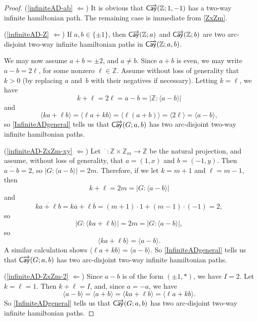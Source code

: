 \documentclass[11pt]{amsart}
\theoremstyle{definition}
\newcounter{case}
\numberwithin{case}{startcases}
\numberwithin{equation}{section}
\newcommand{\Z}{\mathbb{Z}}  %
\newcommand{\cayd}{\mathop{\mathsf{C}\mkern-1mu\overrightarrow{\mathsf{ay}}}}
\begin{document}
	\begin{proof}
		
		\medbreak
		
		(\ref{infiniteAD-ab} $\Leftarrow$) It is obvious that $\cayd(\Z; 1, -1)$ has a two-way infinite hamiltonian path. The remaining case is immediate from \cref{ZxZm}.
		
		\medbreak
		(\ref{infiniteAD-Z} $\Leftarrow$) If $a , b \in \{\pm 1\}$, then $\cayd(\Z; a)$ and $\cayd(\Z; b)$ are two arc-disjoint two-way infinite hamiltonian paths in $\cayd(\Z; a, b)$. 
		
		We may now assume $a + b = \pm 2$, and $a \neq b$. Since $a + b$ is even, we may write $a - b = 2\ell$, for some nonzero $\ell \in \Z$. Assume without loss of generality that $k > 0$ (by replacing $a$ and~$b$ with their negatives if necessary). Letting $k = \ell$, we have 
		\[ k + \ell = 2\ell = a - b = |\Z : \langle a - b \rangle| \]
		and
		\[ \langle k a + \ell b \rangle
		= \langle \ell a + k b \rangle
		= \langle \ell (a + b) \rangle
		= \langle 2 \ell \rangle
		= \langle a - b \rangle , \]
		so \cref{InfiniteADgeneral} tells us that $\cayd(G; a, b)$ has two arc-disjoint two-way infinite hamiltonian paths.
		
		\medbreak
		
		(\ref{infiniteAD-ZxZm-xy} $\Leftarrow$) Let $\overline{\phantom{x}} \colon \Z \times \Z_m \to \Z$ be the natural projection, and assume, without loss of generality, that $a = (1, x)$ and $b = (-1, y)$. Then $\overline {a - b} = 2$, so $|G \colon \langle a - b \rangle| = 2m$. Therefore, if we let $k = m + 1$ and $\ell = m - 1$, then
		\[ k + \ell 
		= 2m 
		= |G : \langle a - b \rangle | \]
		and
		\[ \overline{k a + \ell b}
		= k \overline a + \ell \overline b
		= (m + 1) \cdot 1 + (m - 1) \cdot (-1)
		= 2 
		, \]
		so 
		\[ |G : \langle k a + \ell b \rangle|
		= 2m
		= |G : \langle a - b \rangle| , \]
		so 
		\[ \langle k a + \ell b \rangle = \langle a - b \rangle . \]
		A similar calculation shows $\langle \ell a + k b \rangle = \langle a - b \rangle$. So \cref{InfiniteADgeneral} tells us that $\cayd(G; a, b)$ has two arc-disjoint two-way infinite hamiltonian paths.
		
		\medbreak
		
		(\ref{infiniteAD-ZxZm-2} $\Leftarrow$) 
		Since $a - b$ is of the form $(\pm 1, *)$, we have $I = 2$. Let $k = \ell = 1$. Then $k + \ell = I$, and, since $a = -a$, we have
		\[ \langle a - b \rangle
		= \langle a + b \rangle 
		= \langle k a + \ell b \rangle
		= \langle \ell a + k b \rangle . \]
		So \cref{InfiniteADgeneral} tells us that $\cayd(G; a, b)$ has two arc-disjoint two-way infinite hamiltonian paths.
		

\end{proof}
\end{document}

